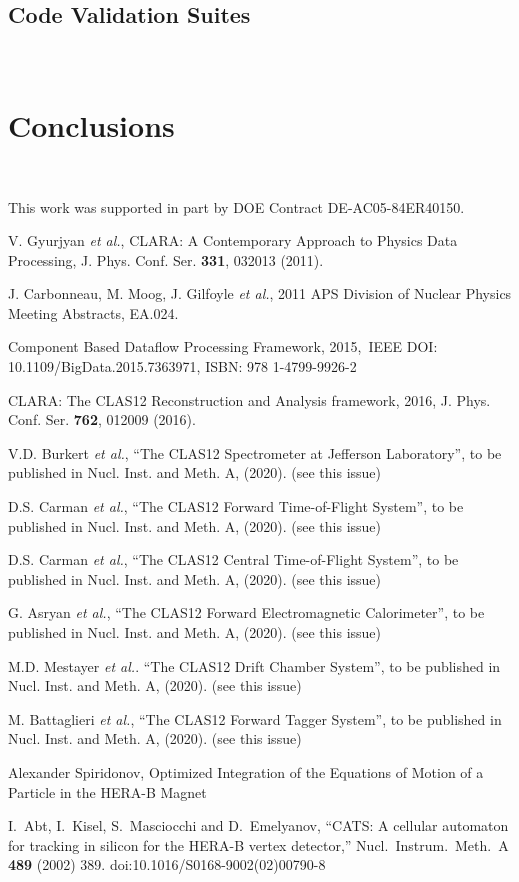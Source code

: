 \documentclass{elsart}
\begin{document}
\subsection{Code Validation Suites}
~~

\section{Conclusions}
~~

\ack

This work was supported in part by DOE Contract DE-AC05-84ER40150.

\begin{thebibliography}{99}

V. Gyurjyan {\it et al.}, CLARA: A Contemporary Approach to Physics Data Processing, J. Phys. Conf. Ser.
{\bf 331}, 032013 (2011).

J. Carbonneau, M. Moog,  J. Gilfoyle {\it et al.}, 2011 APS Division of Nuclear Physics Meeting Abstracts, EA.024.

  Component Based Dataflow Processing Framework, 2015, IEEE DOI: 10.1109/BigData.2015.7363971,
  ISBN: 978 1-4799-9926-2

CLARA: The CLAS12 Reconstruction and Analysis framework, 2016, J. Phys. Conf. Ser. {\bf 762}, 012009 (2016).

V.D. Burkert {\it et al.}, ``The CLAS12 Spectrometer at Jefferson Laboratory'', to be published in Nucl.
Inst. and Meth. A, (2020). (see this issue)

D.S. Carman {\it et al.},   ``The CLAS12 Forward Time-of-Flight System'', to be published in Nucl.
Inst. and Meth. A, (2020). (see this issue)

D.S. Carman {\it et al.}, ``The CLAS12 Central Time-of-Flight System'', to be published in Nucl.
Inst. and Meth. A, (2020). (see this issue)

G. Asryan {\it et al.}, ``The CLAS12 Forward Electromagnetic Calorimeter'', to be published in Nucl.
Inst. and Meth. A, (2020). (see this issue)

M.D. Mestayer {\it et al.}. ``The CLAS12 Drift Chamber System'', to be published in Nucl. Inst. and
Meth. A, (2020). (see this issue)

M. Battaglieri {\it et al.}, ``The CLAS12 Forward Tagger System'', to be published in Nucl. Inst. and
Meth. A, (2020). (see this issue)

Alexander Spiridonov, Optimized Integration of the Equations of Motion of a Particle in the HERA-B Magnet

  I.~Abt, I.~Kisel, S.~Masciocchi and D.~Emelyanov,
  ``CATS: A cellular automaton for tracking in silicon for the HERA-B vertex detector,''
  Nucl.\ Instrum.\ Meth.\ A {\bf 489} (2002) 389.
  doi:10.1016/S0168-9002(02)00790-8

\end{thebibliography}
\end{document}
